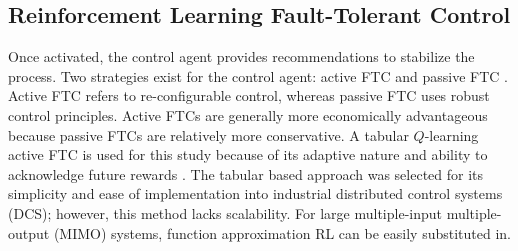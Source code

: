 \subsection{Reinforcement Learning Fault-Tolerant Control}
Once activated, the control agent provides recommendations to stabilize the process.  Two strategies exist for the control agent: active FTC and passive FTC \cite{ftcs_passive_active_ref8}. Active FTC refers to re-configurable control, whereas passive FTC uses robust control principles. Active FTCs are generally more economically advantageous because passive FTCs are relatively more conservative. A tabular $Q$-learning active FTC is used for this study because of its adaptive nature and ability to acknowledge future rewards \cite{rl_control_ref10}.  The tabular based approach was selected for its simplicity and ease of implementation into industrial distributed control systems (DCS); however, this method lacks scalability. For large multiple-input multiple-output (MIMO) systems, function approximation RL can be easily substituted in.


